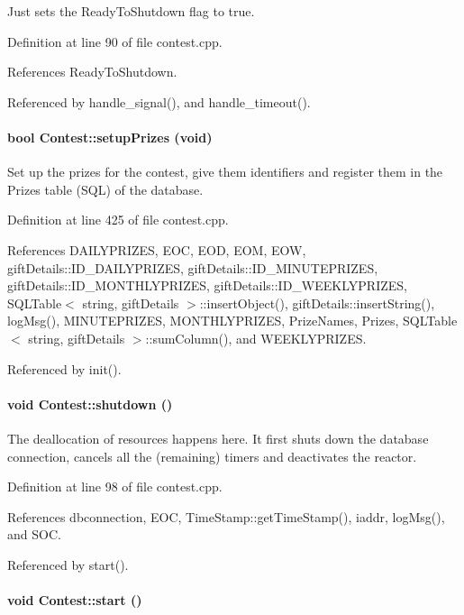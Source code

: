 Just sets the Ready\-To\-Shutdown flag to true. 

Definition at line 90 of file contest.cpp.

References Ready\-To\-Shutdown.

Referenced by handle\_\-signal(), and handle\_\-timeout().\hypertarget{classContest_Contesta10}{
\paragraph[setupPrizes]{\setlength{\rightskip}{0pt plus 5cm}bool Contest::setup\-Prizes (void)}\hfill}
\label{classContest_Contesta10}


Set up the prizes for the contest, give them identifiers and register them in the Prizes table (SQL) of the database. 

Definition at line 425 of file contest.cpp.

References DAILYPRIZES, EOC, EOD, EOM, EOW, gift\-Details::ID\_\-DAILYPRIZES, gift\-Details::ID\_\-MINUTEPRIZES, gift\-Details::ID\_\-MONTHLYPRIZES, gift\-Details::ID\_\-WEEKLYPRIZES, SQLTable$<$ string, gift\-Details $>$::insert\-Object(), gift\-Details::insert\-String(), log\-Msg(), MINUTEPRIZES, MONTHLYPRIZES, Prize\-Names, Prizes, SQLTable$<$ string, gift\-Details $>$::sum\-Column(), and WEEKLYPRIZES.

Referenced by init().\hypertarget{classContest_Contesta3}{
\paragraph[shutdown]{\setlength{\rightskip}{0pt plus 5cm}void Contest::shutdown ()}\hfill}
\label{classContest_Contesta3}


The deallocation of resources happens here. It first shuts down the database connection, cancels all the (remaining) timers and deactivates the reactor. 

Definition at line 98 of file contest.cpp.

References dbconnection, EOC, Time\-Stamp::get\-Time\-Stamp(), iaddr, log\-Msg(), and SOC.

Referenced by start().\hypertarget{classContest_Contesta14}{
\paragraph[start]{\setlength{\rightskip}{0pt plus 5cm}void Contest::start ()}\hfill}
\label{classContest_Contesta14}


